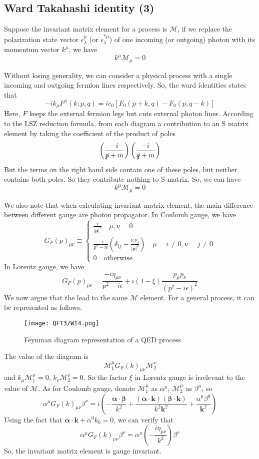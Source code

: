 \documentclass[cyan]{elegantnote}
\begin{document}
\subsection{Ward Takahashi identity (3)}
Suppose the invariant matrix element for a process is $\mathcal{M}$, if we replace the polarization state vector $\epsilon_{\lambda}^{\mu}$ (or $\epsilon_{\lambda}^{*\mu}$) of one incoming (or outgoing) photon with its momentum vector $k^{\mu}$, we have
\[k^{\mu} \mathcal{M}_{\mu} = 0\]
\begin{newproof}
Without losing generality, we can consider a physical process with a single incoming and outgoing fermion lines respectively. So, the ward identities states that
\[-ik_{\mu} F^{\mu}(k;p,q) = ie_0\left[F_0(p+k,q)-F_0(p,q-k)\right]\]
Here, $F$ keeps the external fermion legs but cuts external photon lines. According to the LSZ reduction formula, from each diagram a contribution to an S matrix element by taking the coefficient of the product of poles
\[\left( \frac{-i}{\slashed{p}+m} \right) \left( \frac{-i}{\slashed{q}+m} \right)\] 
But the terms on the right hand side contain one of these poles, but neither contains both poles. So they contribute nothing to S-matrix. 
So, we can have
\[k^{\mu} \mathcal{M}_{\mu} = 0\] 
\end{newproof}

\noindent
We also note that when calculating invariant matrix element, the main difference between different gauge are photon propagator. In Coulomb gauge, we have
\[G_F(p)_{\mu\nu} \equiv \begin{cases} \frac{i}{|\bm{p}|^2} \quad \mu,\nu=0\\  \frac{-i}{p^2-i\epsilon} \left(\delta_{ij} - \frac{p_ip_j}{|\bm{p}|^2}\right) \quad \mu = i \neq 0, \nu = j \neq 0 \\ 0 \quad \mbox{otherwise} \end{cases} \]
In Lorentz gauge, we have
\[G_F(p)_{\mu\nu}  = \frac{-i\eta_{\mu\nu}}{p^2-i\epsilon} + i(1-\xi)\frac{p_{\mu}p_{\nu}}{(p^2-i\epsilon)^2} \]
We now argue that the lead to the same $\mathcal{M}$ element.
For a general process, it can be represented as follows.

\begin{figure}[!h]
\centering
\texttt{[image: QFT3/WI4.png]}
\caption{Feynman diagram representation of a QED process}
\end{figure}

\noindent
The value of the diagram is
\[\mathcal{M}_{1}^{\mu} G_F(k)_{\mu\nu}\mathcal{M}_{2}^{\nu}\]
and $k_{\mu}\mathcal{M}_{1}^{\mu}=0$, $k_{\nu}\mathcal{M}_{2}^{\nu}=0$.
So the factor $\xi$ in Lorentz gauge is irrelevant to the value of $\mathcal{M}$. As for Coulomb gauge, denote $\mathcal{M}_{1}^{\mu}$ as $\alpha^{\mu}$, $\mathcal{M}_{2}^{\mu}$ as $\beta^{\mu}$, so 
\[\alpha^{\mu} G_F(k)_{\mu\nu} \beta^{\nu} = i\left( -\frac{\bm{\alpha} \cdot \bm{\beta}}{k^2} + \frac{(\bm{\alpha}\cdot\bm{k})(\bm{\beta}\cdot\bm{k})}{k^2 \bm{k}^2} + \frac{\alpha^0 \beta^0 }{\bm{k}^2} \right)\]
Using the fact that $\bm{\alpha}\cdot\bm{k} + \alpha^0 k_0 = 0$, we can verify that
\[\alpha^{\mu} G_F(k)_{\mu\nu} \beta^{\nu} = \alpha^{\mu} \left( -\frac{i\eta_{\mu\nu}}{k^2} \right)\beta^{\nu}\]
So, the invariant matrix element is gauge invariant.
\end{document}
